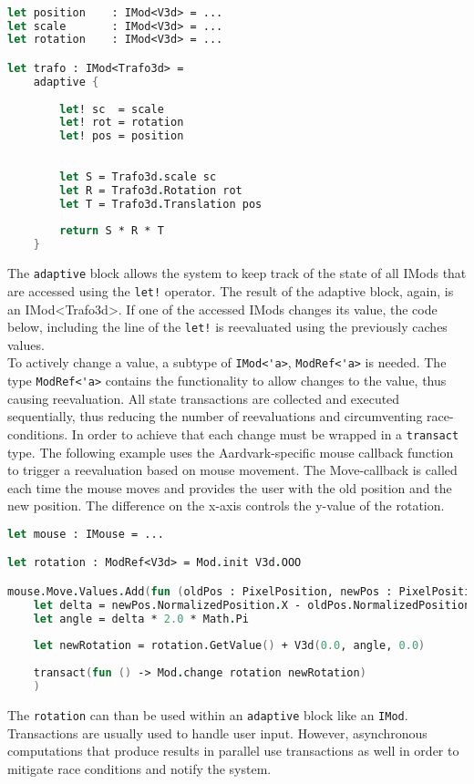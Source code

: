 \begin{lstlisting}[language = FSharp]

let position 	: IMod<V3d> = ... 
let scale 		: IMod<V3d> = ... 
let rotation	: IMod<V3d> = ...

let trafo : IMod<Trafo3d> = 
	adaptive {
	
		let! sc  = scale
		let! rot = rotation
		let! pos = position
		
		
		let S = Trafo3d.scale sc
		let R = Trafo3d.Rotation rot
		let T = Trafo3d.Translation pos
		
		return S * R * T
	}
\end{lstlisting}
The \verb|adaptive| block allows the system to keep track of the state of all IMods that are accessed using the \verb|let!| operator. The result of the adaptive block, again, is an IMod<Trafo3d>. If one of the accessed IMods changes its value, the code below, including the line of the \verb|let!| is reevaluated using the previously caches values. 
\\

To actively change a value, a subtype of \verb|IMod<'a>|, \verb|ModRef<'a>| is needed. The type \verb|ModRef<'a>| contains the functionality to allow changes to the value, thus causing reevaluation. All state transactions are collected and executed sequentially, thus reducing the number of reevaluations and circumventing race-conditions. In order to achieve that each change must be wrapped in a \verb|transact| type. 
The following example uses the Aardvark-specific mouse callback function to trigger a reevaluation based on mouse movement. The Move-callback is called each time the mouse moves and provides the user with the old position and the new position. The difference on the x-axis controls the y-value of the rotation. 

\begin{lstlisting}[language = FSharp]
let mouse : IMouse = ...

let rotation : ModRef<V3d> = Mod.init V3d.OOO

mouse.Move.Values.Add(fun (oldPos : PixelPosition, newPos : PixelPosition) -> 
	let delta = newPos.NormalizedPosition.X - oldPos.NormalizedPosition.X
	let angle = delta * 2.0 * Math.Pi
	
	let newRotation = rotation.GetValue() + V3d(0.0, angle, 0.0)
	
	transact(fun () -> Mod.change rotation newRotation)
	)
\end{lstlisting}

The \verb|rotation| can than be used within an \verb|adaptive| block like an \verb|IMod|. 
\\
Transactions are usually used to handle user input. However, asynchronous computations that produce results in parallel use transactions as well in order to mitigate race conditions and notify the system. 


